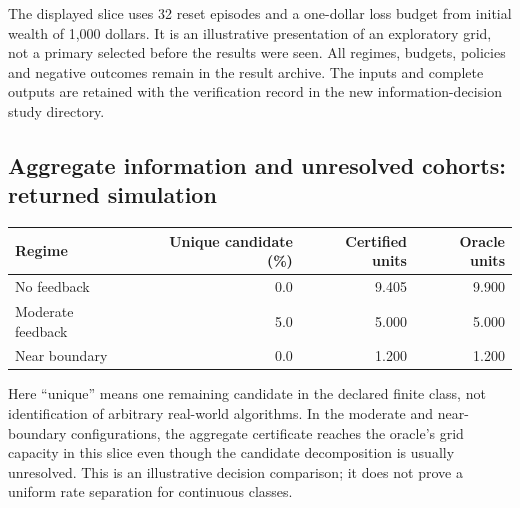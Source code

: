 \documentclass[12pt]{article}
\theoremstyle{definition}
\theoremstyle{remark}
\begin{document}
The displayed slice uses 32 reset episodes and a one-dollar loss budget from
initial wealth of 1,000 dollars. It is an illustrative presentation of an
exploratory grid, not a primary selected before the results were seen. All
regimes, budgets, policies and negative outcomes remain in the result archive.
The inputs and complete outputs are retained with the verification record in
the new information-decision study directory.

\subsection*{Aggregate information and unresolved cohorts: returned simulation}
\begin{center}\small
\begin{tabular}{lrrr}
\toprule
Regime & Unique candidate (\%) & Certified units & Oracle units\\
\midrule
No feedback & 0.0 & 9.405 & 9.900\\
Moderate feedback & 5.0 & 5.000 & 5.000\\
Near boundary & 0.0 & 1.200 & 1.200\\
\bottomrule
\end{tabular}
\end{center}
Here ``unique'' means one remaining candidate in the declared finite class,
not identification of arbitrary real-world algorithms. In the moderate and
near-boundary configurations, the aggregate certificate reaches the oracle's
grid capacity in this slice even though the candidate decomposition is usually
unresolved. This is an illustrative decision comparison; it does not prove a
uniform rate separation for continuous classes.
\end{document}
